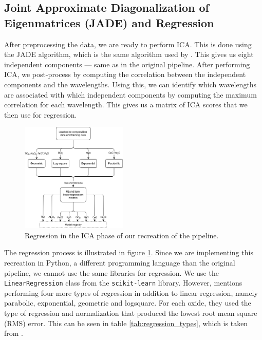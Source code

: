 \subsection{Joint Approximate Diagonalization of Eigenmatrices (JADE) and Regression}
After preprocessing the data, we are ready to perform ICA.
This is done using the JADE algorithm, which is the same algorithm used by \citeauthor{cleggRecalibrationMarsScience2017}.
This gives us eight independent components --- same as in the original pipeline.
After performing ICA, we post-process by computing the correlation between the independent components and the wavelengths.
Using this, we can identify which wavelengths are associated with which independent components by computing the maximum correlation for each wavelength.
This gives us a matrix of ICA scores that we then use for regression.

\begin{figure}
	\centering
	\includegraphics[width=0.45\textwidth]{images/ica_regression.png}
	\caption{Regression in the ICA phase of our recreation of the pipeline.}
	\label{fig:ica_regression}
\end{figure}

The regression process is illustrated in figure \ref{fig:ica_regression}.
Since we are implementing this recreation in Python, a different programming language than the original pipeline, we cannot use the same libraries for regression.
We use the \texttt{LinearRegression} class from the \texttt{scikit-learn} library\cite{scikit-learn}.
However, \citeauthor{cleggRecalibrationMarsScience2017} mentions performing four more types of regression in addition to linear regression, namely parabolic, exponential, geometric and logsquare.
For each oxide, they used the type of regression and normalization that produced the lowest root mean square (RMS) error.
This can be seen in table \ref{tab:regression_types}, which is taken from \citeauthor{cleggRecalibrationMarsScience2017}.

